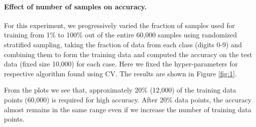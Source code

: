 \documentclass[10pt]{scrartcl}
\begin{document}
\paragraph{Effect of number of samples on accuracy.}
For this experiment,  we progressively varied the fraction of samples used for training from 1\% to 100\% out of the entire 60,000 samples using randomized stratified sampling, taking the fraction of data from each class (digits 0-9) and combining them to form the training data and computed the accuracy on the test data (fixed size 10,000) for each case. Here we fixed the hyper-parameters for respective algorithm found using CV. The results are shown in Figure \ref{fig:1}.

From the plots we see that, approximately 20\% (12,000) of the training data points (60,000) is required for high accuracy. After 20\% data points, the accuracy 
almost remains in the same range even if we increase the number of training data points.
\end{document}

